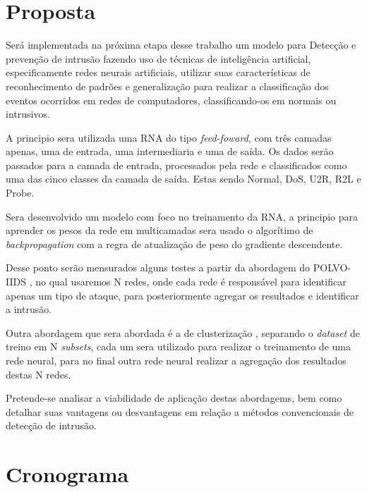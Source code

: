 \documentclass[
	12pt,				%
	openright,			%
	oneside,
	a4paper,			%
	english,			%
	french,				%
	spanish,			%
	brazil				%
	]{abntex2}
\begin{document}
\chapter[Proposta]{Proposta}

Será implementada na próxima etapa desse trabalho um modelo para Detecção e prevenção de intrusão fazendo uso de técnicas de inteligência artificial, especificamente redes neurais artificiais, utilizar suas características de reconhecimento de padrões e generalização para realizar a classificação dos eventos ocorridos em redes de computadores, classificando-os em normais ou intrusivos.

A principio sera utilizada uma RNA do tipo \textit{feed-foward}, com três camadas apenas, uma de entrada, uma intermediaria e uma de saída. Os dados serão passados para a camada de entrada, processados pela rede e classificados como uma das cinco classes da camada de saída. Estas sendo Normal, DoS, U2R, R2L e Probe.  

Sera desenvolvido um modelo com foco no treinamento da RNA, a principio para aprender os pesos da rede em multicamadas sera usado o algorítimo de \textit{backpropagation} com a regra de atualização de peso do gradiente descendente.

Desse ponto serão mensurados alguns testes a partir da abordagem do POLVO-IIDS \cite{polvo1}, no qual usaremos N redes, onde cada rede é responsável para identificar apenas um tipo de ataque, para posteriormente agregar os resultados e identificar a intrusão.

Outra abordagem que sera abordada é a de clusterização \cite{Surana}, separando o \textit{dataset} de treino em N \textit{subsets}, cada um sera utilizado para realizar o treinamento de uma rede neural, para no final outra rede neural realizar a agregação dos resultados destas N redes.

 
Pretende-se analisar a viabilidade de aplicação destas abordagems, bem como
detalhar suas vantagens ou desvantagens em relação a métodos convencionais de
detecção de intrusão.


\chapter[Cronograma]{Cronograma}
\end{document}
